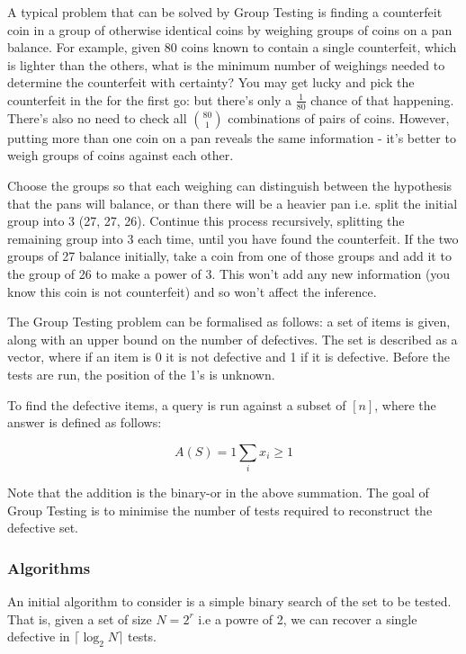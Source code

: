A typical problem that can be solved by Group Testing is finding a counterfeit coin in a group of otherwise identical coins by weighing groups of coins on a pan balance. For example, given 80 coins known to contain a single counterfeit, which is lighter than the others, what is the minimum number of weighings needed to determine the counterfeit with certainty? You may get lucky and pick the counterfeit in the for the first go: but there's only a \(\frac{1}{80}\) chance of that happening. There's also no need to check all \(80 \choose 1\) combinations of pairs of coins. However, putting more than one coin on a pan reveals the same information  - it's better to weigh groups of coins against each other.

Choose the groups so that each weighing can distinguish between the hypothesis that the pans will balance, or than there will be a heavier pan i.e. split the initial group into 3 (27, 27, 26). Continue this process recursively, splitting the remaining group into 3 each time, until you have found the counterfeit. If the two groups of 27 balance initially, take a coin from one of those groups and add it to the group of 26 to make a power of 3. This won't add any new information (you know this coin is not counterfeit) and so won't affect the inference.

The Group Testing problem can be formalised as follows: a set of items is given, along with an upper bound on the number of defectives. The set is described as a vector, where if an item is 0 it is not defective and 1 if it is defective. Before the tests are run, the position of the 1's is unknown. 

To find the defective items, a query is run against a subset of \([n]\), where the answer is defined as follows:

\begin{equation}
A\left(S\right) = 1 \sum_{i} x_i \geq 1
\end{equation}

Note that the addition is the binary-or in the above summation. The goal of Group Testing is to minimise the number of tests required to reconstruct the defective set.

\subsubsection*{Algorithms}
An initial algorithm to consider is a simple binary search of the set to be tested. That is, given a set of size \(N = 2^r\) i.e a powre of 2, we can recover a single defective in
\(\lceil{\log_2{N}}\rceil\) tests.


